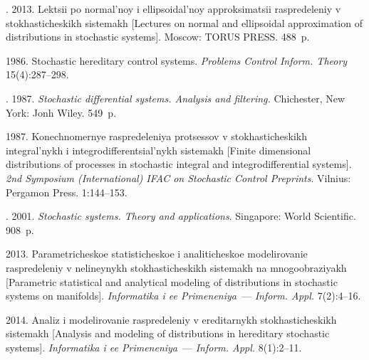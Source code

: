   \begin{multicols}{2}

\renewcommand{\bibname}{\protect\rmfamily References}

{\small\frenchspacing
 {%
 \begin{thebibliography}{99}



.  2013.
Lektsii po normal'noy i ellipsoidal'noy approksimatsii raspredeleniy
v stokhasticheskikh sistemakh [Lectures on normal and ellipsoidal
approximation of distributions in stochastic systems].
Moscow: TORUS PRESS. 488~p.

  1986.
{Stochastic hereditary control systems}.
\textit{Problems Control Inform. Theory} 15(4):287--298.

.  1987.
\textit{Stochastic differential systems. Analysis and filtering.}
Chichester, New York: Jonh Wiley. 549~p.

  1987.
Konechnomernye raspredeleniya protsessov v stokhasticheskikh integral'nykh
i in\-teg\-ro\-dif\-fe\-ren\-tsial'nykh sistemakh [Finite dimensional distributions
of processes in stochastic integral and integrodifferential systems].
\textit{2nd  Symposium (International) IFAC on Stochastic Control
Preprints}. Vilnius: Pergamon Press. 1:144--153.

. 2001.
\textit{Stochastic systems. Theory and  applications}.
Singapore: World Scientific. 908~p.

  2013.
Parametricheskoe statisticheskoe i analiticheskoe modelirovanie
raspredeleniy v nelineynykh stokhasticheskikh sistemakh na mnogoobraziyakh
[Parametric statistical and analytical modeling of distributions in
stochastic systems on manifolds].
\textit{Informatika i ee Primeneniya}~--- \textit{Inform. Appl.} 7(2):4--16.


  2014.
Analiz i modelirovanie raspredeleniy v ereditarnykh stokhasticheskikh sistemakh
[Analysis and modeling of distributions in hereditary stochastic systems].
\textit{Informatika i ee Primeneniya}~--- \textit{Inform. Appl.} 8(1):2--11.


\end{thebibliography}}}
\end{multicols}
